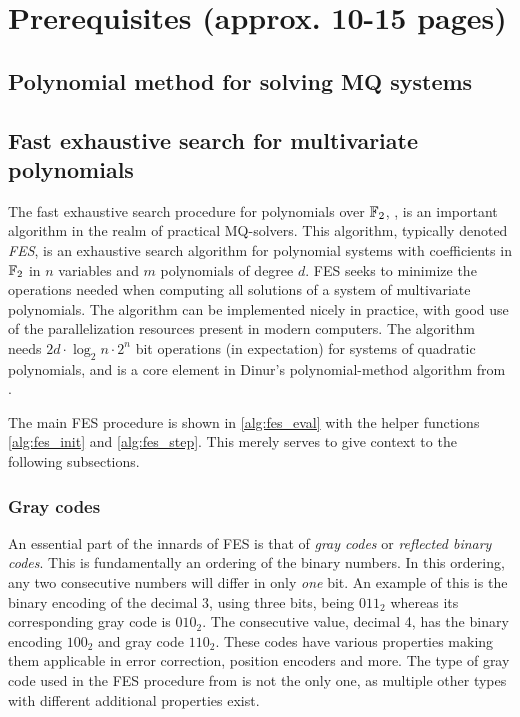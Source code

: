 \section{Prerequisites (approx. 10-15 pages)} \label{sec:prereq}

\subsection{Polynomial method for solving MQ systems} \label{sec:prereq:polymethod}

\subsection{Fast exhaustive search for multivariate polynomials}
\label{sec:prereq:fes}
The fast exhaustive search procedure for polynomials over $\mathbb{F}_2$, \cite{cryptoeprint:2010/313, cryptoeprint:2013/436}, is an important algorithm in the realm of practical MQ-solvers. This algorithm, typically denoted \textit{FES}, is an exhaustive search algorithm for polynomial systems with coefficients in $\mathbb{F}_2$ in $n$ variables and $m$ polynomials of degree $d$. FES seeks to minimize the operations needed when computing all solutions of a system of multivariate polynomials. The algorithm can be implemented nicely in practice, with good use of the parallelization resources present in modern computers. The algorithm needs $2d\cdot \log_2n \cdot 2^n$ bit operations (in expectation) for systems of quadratic polynomials, and is a core element in Dinur's polynomial-method algorithm from \cite{cryptoeprint:2021/578}.

The main FES procedure is shown in \cref{alg:fes_eval} with the helper functions \cref{alg:fes_init} and \cref{alg:fes_step}. This merely serves to give context to the following subsections.

\subsubsection{Gray codes} \label{sec:prereq:fes:gray_codes}

An essential part of the innards of FES is that of \textit{gray codes} or \textit{reflected binary codes}. This is fundamentally an ordering of the binary numbers. In this ordering, any two consecutive numbers will differ in only \textit{one} bit. An example of this is the binary encoding of the decimal 3, using three bits, being $011_2$ whereas its corresponding gray code is $010_2$. The consecutive value, decimal 4, has the binary encoding $100_2$ and gray code $110_2$. These codes have various properties making them applicable in error correction, position encoders and more. The type of gray code used in the FES procedure from \cite{cryptoeprint:2010/313, cryptoeprint:2013/436} is not the only one, as multiple other types with different additional properties exist.

